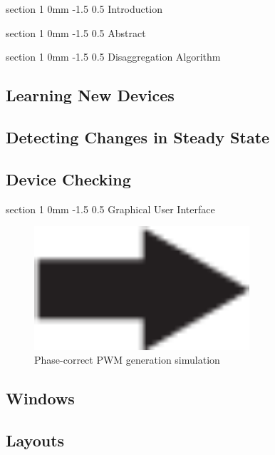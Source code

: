 \documentclass[danish,a4paper,11pt]{article}
\makeatletter
\numberwithin{equation}{section}
\renewcommand{\section}{\@startsection
	{section}%
	{1}%
	{0mm}%
	{-1.5\baselineskip}%
	{0.5\baselineskip}%
	{\normalfont\Large\bfseries}} %
\makeatother
\begin{document}
%

\tableofcontents
\newpage
	

\section{Introduction}


\section{Abstract}

\section{Disaggregation Algorithm}
\subsection{Learning New Devices}
\subsection{Detecting Changes in Steady State}
\subsection{Device Checking}

\section{Graphical User Interface}

\begin{figure}[H]
	\centering
	\includegraphics[width=8cm]{Figurer/derp.png}
	\caption{Phase-correct PWM generation simulation}
	\label{fig:PWM}
\end{figure}

\subsection{Windows}
\subsection{Layouts}
\end{document}
